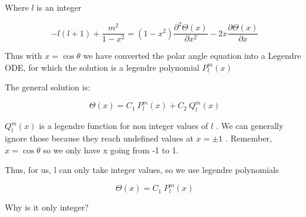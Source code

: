 \documentclass[12pt]{article}
\renewcommand{\_}{\kern-1.5pt\textunderscore\kern-1.5pt}
\begin{document}
Where  \( l \)  is an integer\par

 \[ -l \left( l+1 \right) +\frac{m^{2}}{1-x^{2}}= \left( 1-x^{2} \right) \frac{ \partial ^{2} \Theta  \left( x \right) }{ \partial x^{2}}-2x\frac{ \partial  \Theta  \left( x \right) }{ \partial x} \] \par

Thus with  \( x=\cos  \theta  \)  we have converted the polar angle equation into a Legendre ODE, for which the solution is a legendre polynomial  \( P_{l}^{m} \left( x \right)  \) \par

The general solution is:\par

 \[  \Theta  \left( x \right) =C_{1}~P_{l}^{m} \left( x \right) +C_{2}~Q_{l}^{m} \left( x \right)  \] \par

 \( Q_{l}^{m} \left( x \right)  \)  is a legendre function for non integer values of  \( l \) . We can generally ignore those because they reach undefined values at  \( x= \pm 1 \) . Remember,  \( x=\cos  \theta  \)  so we only have x going from -1 to 1. \par

Thus, for us, l can only take integer values, so we use legendre polynomials \par

 \[  \Theta  \left( x \right) =C_{1}~P_{l}^{m} \left( x \right)  \] \par

Why is it only integer?\par


\printbibliography
\end{document}
